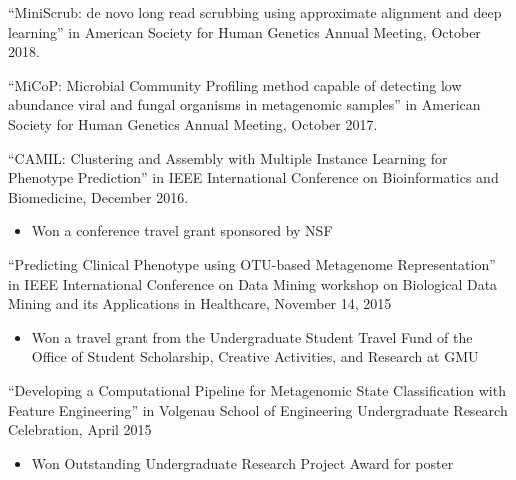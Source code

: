\documentclass[margin, 10pt]{res} %
\begin{document}
\begin{resume}
``MiniScrub: de novo long read scrubbing using approximate alignment and deep learning'' in American Society for Human Genetics Annual Meeting, October 2018.

``MiCoP: Microbial Community Profiling method capable of detecting low abundance viral and fungal organisms in metagenomic samples'' in American Society for Human Genetics Annual Meeting, October 2017.

``CAMIL: Clustering and Assembly with Multiple Instance Learning for Phenotype Prediction'' in IEEE International Conference on Bioinformatics and Biomedicine, December 2016.
\begin{itemize} \itemsep -2pt %
\item Won a conference travel grant sponsored by NSF
\end{itemize}

``Predicting Clinical Phenotype using OTU-based Metagenome Representation'' in IEEE International Conference on Data Mining workshop on Biological Data Mining and its Applications in Healthcare, November 14, 2015
\begin{itemize} \itemsep -2pt %
\item Won a travel grant from the Undergraduate Student Travel Fund of the Office of Student Scholarship, Creative Activities, and Research at GMU
\end{itemize}

``Developing a Computational Pipeline for Metagenomic State Classification with Feature Engineering'' in Volgenau School of Engineering Undergraduate Research Celebration, April 2015
\begin{itemize} \itemsep -2pt %
\item Won Outstanding Undergraduate Research Project Award for poster
\end{itemize}



\end{resume}
\end{document}
